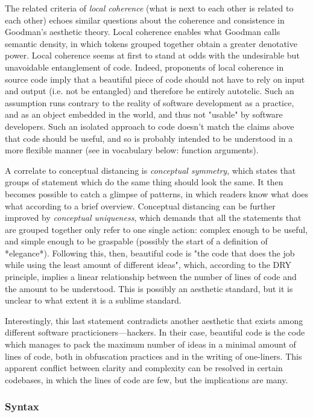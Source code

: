 The related criteria of \emph{local coherence} (what is next to each other is related to each other) echoes similar questions about the coherence and consistence in Goodman's aesthetic theory. Local coherence enables what Goodman calls semantic density, in which tokens grouped together obtain a greater denotative power. Local coherence seems at first to stand at odds with the undesirable but unavoidable entanglement of code. Indeed, proponents of local coherence in source code imply that a beautiful piece of code should not have to rely on input and output (i.e. not be entangled) and therefore be entirely autotelic. Such an assumption runs contrary to the reality of software development as a practice, and as an object embedded in the world, and thus not "usable" by software developers. Such an isolated approach to code doesn't match the claims above that code should be useful, and so is probably intended to be understood in a more flexible manner (see in vocabulary below: function arguments).

A correlate to conceptual distancing is \emph{conceptual symmetry}, which states that groups of statement which do the same thing should look the same. It then becomes possible to catch a glimpse of patterns, in which readers know what does what according to a brief overview. Conceptual distancing can be further improved by \emph{conceptual uniqueness}, which demands that all the statements that are grouped together only refer to one single action: complex enough to be useful, and simple enough to be graspable (possibly the start of a definition of *elegance*). Following this, then, beautiful code is "the code that does the job while using the least amount of different ideas", which, according to the DRY principle, implies a linear relationship between the number of lines of code and the amount to be understood. This is possibly an aesthetic standard, but it is unclear to what extent it is a sublime standard.

Interestingly, this last statement contradicts another aesthetic that exists among different software practicioners—hackers. In their case, beautiful code is the code which manages to pack the maximum number of ideas in a minimal amount of lines of code, both in obfuscation practices and in the writing of one-liners. This apparent conflict between clarity and complexity can be resolved in certain codebases, in which the lines of code are few, but the implications are many.

\subsubsection{Syntax}
\label{subsubsec:framework-syntax}

